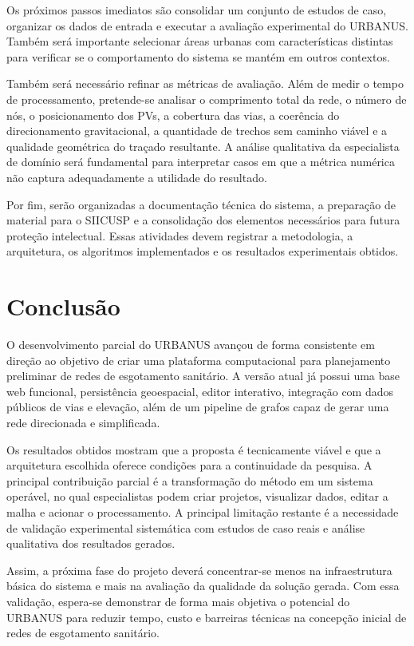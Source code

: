 \documentclass[12pt,a4paper]{article}
\begin{document}
Os próximos passos imediatos são consolidar um conjunto de estudos de caso, organizar os dados de entrada e executar a avaliação experimental do URBANUS. Também será importante selecionar áreas urbanas com características distintas para verificar se o comportamento do sistema se mantém em outros contextos.

Também será necessário refinar as métricas de avaliação. Além de medir o tempo de processamento, pretende-se analisar o comprimento total da rede, o número de nós, o posicionamento dos PVs, a cobertura das vias, a coerência do direcionamento gravitacional, a quantidade de trechos sem caminho viável e a qualidade geométrica do traçado resultante. A análise qualitativa da especialista de domínio será fundamental para interpretar casos em que a métrica numérica não captura adequadamente a utilidade do resultado.

Por fim, serão organizadas a documentação técnica do sistema, a preparação de material para o SIICUSP e a consolidação dos elementos necessários para futura proteção intelectual. Essas atividades devem registrar a metodologia, a arquitetura, os algoritmos implementados e os resultados experimentais obtidos.

\section{Conclusão}

O desenvolvimento parcial do URBANUS avançou de forma consistente em direção ao objetivo de criar uma plataforma computacional para planejamento preliminar de redes de esgotamento sanitário. A versão atual já possui uma base web funcional, persistência geoespacial, editor interativo, integração com dados públicos de vias e elevação, além de um pipeline de grafos capaz de gerar uma rede direcionada e simplificada.

Os resultados obtidos mostram que a proposta é tecnicamente viável e que a arquitetura escolhida oferece condições para a continuidade da pesquisa. A principal contribuição parcial é a transformação do método em um sistema operável, no qual especialistas podem criar projetos, visualizar dados, editar a malha e acionar o processamento. A principal limitação restante é a necessidade de validação experimental sistemática com estudos de caso reais e análise qualitativa dos resultados gerados.

Assim, a próxima fase do projeto deverá concentrar-se menos na infraestrutura básica do sistema e mais na avaliação da qualidade da solução gerada. Com essa validação, espera-se demonstrar de forma mais objetiva o potencial do URBANUS para reduzir tempo, custo e barreiras técnicas na concepção inicial de redes de esgotamento sanitário.
\end{document}
